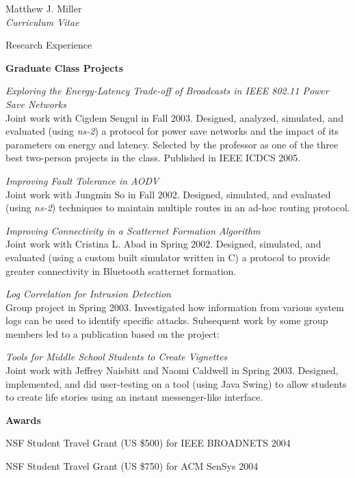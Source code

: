 \documentclass[10pt]{article}
\newenvironment{subbulletlist}{%
	\begin{list}{\labelitemii}{%
		\setlength{\topsep}{\itemsep}\setlength{\parskip}{\parsep}%
	}%
}%
{ \end{list} }
\begin{document}
\begin{cv}{Matthew J. Miller\\{\large \itshape Curriculum Vitae}}
\begin{cvlist}{Research Experience}
	\item \textbf{Graduate Class Projects}
	\begin{subbulletlist}
		\item \textit{Exploring the Energy-Latency Trade-off of Broadcasts
		in IEEE 802.11 Power Save Networks}\\
		Joint work with Cigdem Sengul in Fall 2003.  
		Designed, analyzed, simulated, and evaluated (using \textit{ns-2}) 
		a protocol for power save networks and the 
		impact of its parameters on energy and latency.  Selected by the
		professor as one of the three best two-person projects in the
		class.  Published in IEEE ICDCS 2005.
		\item \textit{Improving Fault Tolerance in AODV}\\
		Joint work with Jungmin So in Fall 2002.  Designed, simulated,
		and evaluated (using \textit{ns-2})
		techniques to maintain multiple routes in an ad-hoc routing protocol.
		\item \textit{Improving Connectivity in a Scatternet Formation
		Algorithm}\\
		Joint work with Cristina L. Abad in Spring 2002.  Designed,
		simulated, and evaluated (using a custom built simulator written
		in C) a protocol to provide greater
		connectivity in Bluetooth scatternet formation. 
		\item \textit{Log Correlation for Intrusion Detection}\\
		Group project in Spring 2003.  Investigated how information 
		from various system
		logs can be used to identify specific attacks.  Subsequent work 
		by some group members led to a publication based on the
		project:  
		\renewcommand*{\biblabelsep}{1.5em}
		\item \textit{Tools for Middle School Students to Create Vignettes}\\
		Joint work with Jeffrey Naisbitt and Naomi Caldwell in Spring
		2003.  Designed, implemented, and did user-testing on a
		tool (using Java Swing) to allow students to create life 
		stories using an instant messenger-like interface.
	\end{subbulletlist}
	\item \textbf{Awards}
	\begin{subbulletlist}
		\item NSF Student Travel Grant (US \$500) for IEEE BROADNETS 2004 
		\item NSF Student Travel Grant (US \$750) for ACM SenSys 2004

\end{subbulletlist}
\end{cvlist}
\end{cv}
\end{document}
